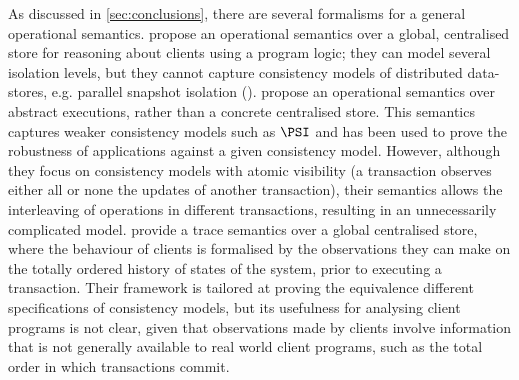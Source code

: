 As discussed in \cref{sec:conclusions}, there are several formalisms for a general operational semantics.
\cite{alonetogether} propose an operational
semantics over a global, centralised store for reasoning about clients using a program logic; 
they can model several isolation levels, but they cannot
capture consistency models of distributed data-stores, e.g.  
parallel snapshot isolation (\PSI). 
\cite{sureshConcur} propose an operational semantics over abstract executions, 
rather than a concrete centralised store. This semantics captures weaker consistency models
such as \(\PSI\) and has been used to prove the robustness of applications against
a given consistency model. However, although they focus on consistency models with atomic 
visibility (a transaction observes either all or none the updates of another transaction), 
their semantics allows the interleaving of operations in different transactions, resulting in an unnecessarily complicated model.
\cite{seebelieve} provide a trace semantics over a global
centralised store, where the behaviour of clients is formalised by the   
observations they can make on the totally ordered history of states of the system, prior to executing a transaction. 
Their framework is tailored at proving the equivalence different specifications of consistency models, 
but its usefulness  for analysing client programs is not clear, 
 given that observations made by clients involve information that is not generally 
available to real world client programs, such as the total order in which transactions commit.


